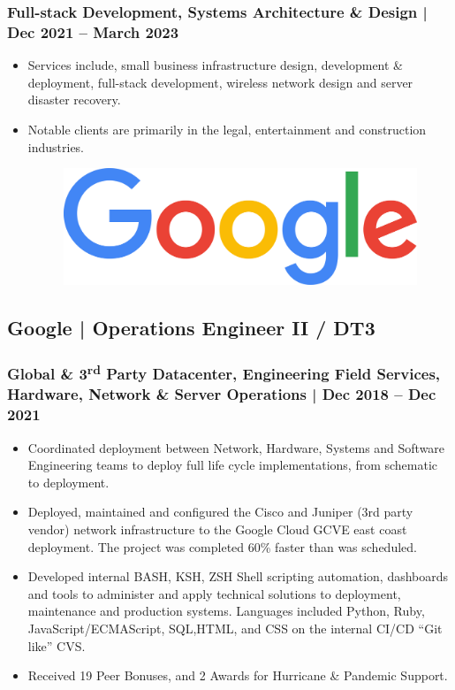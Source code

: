 \documentclass[letter,10pt]{article}
\begin{document}
\subsubsection*{Full-stack Development, Systems Architecture \& Design | Dec 2021 – March 2023}
\label{sec:org7c2ffa0}
\begin{itemize}
\item Services include, small business infrastructure design, development \& deployment, full-stack development, wireless network design and server disaster recovery.
\label{sec:org6b2ebf4}
\item Notable clients are primarily in the legal, entertainment and construction industries.
\label{sec:org796bef2}



\begin{figure}
\includegraphics[width=0.85\linewidth]{./img/cr_google.jpg}
\end{figure}
\end{itemize}

\subsection*{Google | Operations Engineer II / DT3}
\label{sec:org023312b}
\subsubsection*{Global \& 3\textsuperscript{rd} Party Datacenter, Engineering Field Services, Hardware, Network \& Server Operations | Dec 2018 – Dec 2021}
\label{sec:orgff7d3d7}
\begin{itemize}
\item Coordinated deployment between Network, Hardware, Systems and Software Engineering teams to deploy full life cycle implementations, from schematic to deployment.
\item Deployed, maintained and configured the Cisco and Juniper (3rd party vendor) network infrastructure to the Google Cloud GCVE east coast deployment. The project was completed 60\% faster than was scheduled.
\item Developed internal BASH, KSH, ZSH Shell scripting automation, dashboards and tools to administer and apply technical solutions to deployment, maintenance and production systems. Languages included Python, Ruby, JavaScript/ECMAScript, SQL,HTML, and CSS on the internal CI/CD “Git like” CVS.
\item Received 19 Peer Bonuses, and 2 Awards for Hurricane \& Pandemic Support.
\end{itemize}
\end{document}
